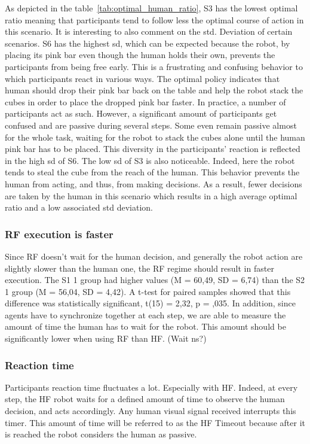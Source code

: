 As depicted in the table~\ref{tab:optimal_human_ratio}, S3 has the lowest optimal ratio meaning that participants tend to follow less the optimal course of action in this scenario. It is interesting to also comment on the std. Deviation of certain scenarios. S6 has the highest sd, which can be expected because the robot, by placing its pink bar even though the human holds their own, prevents the participants from being free early. This is a frustrating and confusing behavior to which participants react in various ways. The optimal policy indicates that human should drop their pink bar back on the table and help the robot stack the cubes in order to place the dropped pink bar faster. In practice, a number of participants act as such. However, a significant amount of participants get confused and are passive during several steps. Some even remain passive almost for the whole task, waiting for the robot to stack the cubes alone until the human pink bar has to be placed. This diversity in the participants' reaction is reflected in the high sd of S6.
The low sd of S3 is also noticeable. Indeed, here the robot tends to steal the cube from the reach of the human. This behavior prevents the human from acting, and thus, from making decisions. As a result, fewer decisions are taken by the human in this scenario which results in a high average optimal ratio and a low associated std deviation. 

\subsubsection*{RF execution is faster}
Since RF doesn't wait for the human decision, and generally the robot action are slightly slower than the human one, the RF regime should result in faster execution.
The S1 1 group had higher values (M = 60,49, SD = 6,74) than the S2 1 group (M = 56,04, SD = 4,42). A t-test for paired samples showed that this difference was statistically significant, t(15) = 2,32, p = ,035.
In addition, since agents have to synchronize together at each step, we are able to measure the amount of time the human has to wait for the robot. This amount should be significantly lower when using RF than HF. (Wait ns?)

\subsubsection*{Reaction time}
Participants reaction time fluctuates a lot. Especially with HF. Indeed, at every step, the HF robot waits for a defined amount of time to observe the human decision, and acts accordingly. Any human visual signal received interrupts this timer. This amount of time will be referred to as the HF Timeout because after it is reached the robot considers the human as passive.

